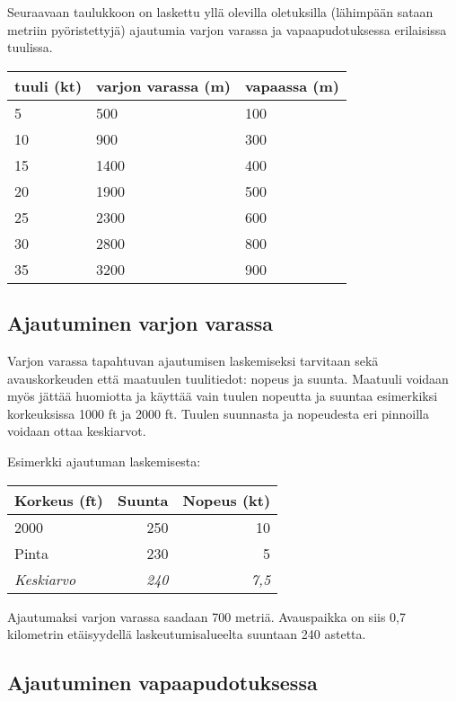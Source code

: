 Seuraavaan taulukkoon on laskettu yllä olevilla oletuksilla (lähimpään sataan metriin pyöristettyjä) ajautumia varjon varassa ja vapaapudotuksessa erilaisissa tuulissa. 

\begin{tabular}[]{|l|p{2.4cm}|l|}
\hline
 \textbf{tuuli (kt)} &  \textbf{varjon varassa (m)} &  \textbf{vapaassa (m)}
\\ \hline
 5 &  500 &  100
\\ \hline
 10 &  900 &  300
\\ \hline
 15 &  1400 &  400
\\ \hline
 20 &  1900 &  500
\\ \hline
 25 &  2300 &  600
\\ \hline
 30 &  2800 &  800
\\ \hline
 35 &  3200 &  900
\\ \hline
\end{tabular}
\subsection{ Ajautuminen varjon varassa }
\label{uloshyppypaikan-maaritys-ajautuminen-varjon-varassa}


Varjon varassa tapahtuvan ajautumisen laskemiseksi tarvitaan sekä avauskorkeuden että maatuulen tuulitiedot: nopeus ja suunta. Maatuuli voidaan myös jättää huomiotta ja käyttää vain tuulen nopeutta ja suuntaa esimerkiksi korkeuksissa 1000 ft ja 2000 ft. Tuulen suunnasta ja nopeudesta eri pinnoilla voidaan ottaa keskiarvot. 


Esimerkki ajautuman laskemisesta: 

\begin{tabular}[]{|l|r|r|}
\hline
 \textbf{Korkeus (ft)} &  \textbf{Suunta} &  \textbf{Nopeus (kt)}
\\ \hline
 2000 &  250 &  10
\\ \hline
 Pinta &  230 &  5
\\ \hline
 \textit{Keskiarvo} &  \textit{240} &  \textit{7,5}
\\ \hline
\end{tabular}

Ajautumaksi varjon varassa saadaan 700 metriä. Avauspaikka on siis 0,7 kilometrin etäisyydellä laskeutumisalueelta suuntaan 240 astetta. 

\subsection{ Ajautuminen vapaapudotuksessa }
\label{uloshyppypaikan-maaritys-ajautuminen-vapaapudotuksessa}


